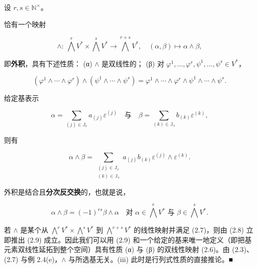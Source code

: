 \begin{proposition}

设 $ r,s \in \mathbb{N}^{\times} $。

\begin{subitems}
\item

恰有一个映射

\begin{equation}
\wedge:\ \bigwedge^{r}V^{*}\times\bigwedge^{s}V^{*} \to \bigwedge^{r+s}V^{*}, \quad (\alpha,\beta) \mapsto \alpha\wedge\beta,\tag{2.6}
\end{equation}

即\textbf{外积}，具有下述性质：
(α) $ \wedge $ 是双线性的；
(β) 对 $ \varphi^{1},\ldots,\varphi^{r},\psi^{1},\ldots,\psi^{s} \in V^{*} $，

\begin{equation}
(\varphi^{1}\wedge\cdots\wedge\varphi^{r})\wedge(\psi^{1}\wedge\cdots\wedge\psi^{s}) = \varphi^{1}\wedge\cdots\wedge\varphi^{r}\wedge\psi^{1}\wedge\cdots\wedge\psi^{s}.\tag{2.7}
\end{equation}
\item

给定基表示

\begin{equation}
\alpha = \sum_{(j)\in\mathbb{J}_{r}} a_{(j)}\varepsilon^{(j)} \quad \text{与} \quad \beta = \sum_{(k)\in\mathbb{J}_{s}} b_{(k)}\varepsilon^{(k)},\tag{2.8}
\end{equation}

则有

\begin{equation}
\alpha\wedge\beta = \sum_{\substack{(j)\in\mathbb{J}_{r}\\ (k)\in\mathbb{J}_{s}}} a_{(j)}b_{(k)}\varepsilon^{(j)}\wedge\varepsilon^{(k)}.\tag{2.9}
\end{equation}
\item

外积是结合且\textbf{分次反交换}的，也就是说，

\[
\alpha\wedge\beta = (-1)^{rs}\beta\wedge\alpha \quad \text{对 } \alpha \in \bigwedge^{r}V^{*} \text{ 与 } \beta \in \bigwedge^{s}V^{*}.
\]

\proofhead
若 $ \wedge $ 是某个从 $ \bigwedge^{r}V^{*}\times\bigwedge^{s}V^{*} $ 到 $ \bigwedge^{r+s}V^{*} $ 的线性映射并满足 (2.7)，则由 (2.8) 立即推出 (2.9) 成立。因此我们可以用 (2.9) 和一个给定的基来唯一地定义（即把基元素双线性延拓到整个空间）具有性质 (α) 与 (β) 的双线性映射 (2.6)。由 (2.3)、(2.7) 与例 2.4(e)，$ \wedge $ 与所选基无关。(iii) 此时是行列式性质的直接推论。\nobreak\hspace{0.35em}■
\end{subitems}

\end{proposition}

